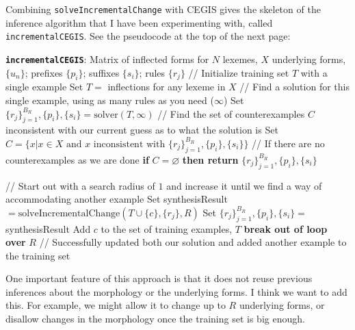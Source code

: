 \documentclass{article}
\begin{document}
Combining \texttt{solveIncrementalChange} with CEGIS gives the
skeleton of the inference algorithm that I have been experimenting
with, called \texttt{incrementalCEGIS}. See the pseudocode at the top of the next page:
\pagebreak
\begin{algorithmic}
  \STATE \textbf{\texttt{incrementalCEGIS}}:
   Matrix of inflected forms for $N$ lexemes, $X$
   underlying forms, $\{u_n\}$; prefixes $\{p_i\}$; suffixes $\{s_i\}$; rules $\{r_j\}$
  \STATE // Initialize training set $T$ with a single example
  \STATE Set $T = $ inflections for any lexeme in $X$
  \STATE // Find a solution for this single example, using as many rules as you need ($\infty$)
  \STATE Set $\{r_j\}_{j = 1}^{B_R}, \{p_i\}, \{s_i\} = \text{solver}(T,\infty)$
  \REPEAT
  \STATE // Find the set of counterexamples $C$ inconsistent with our current guess as to what the solution is
  \STATE Set $C = \{x | x\in X \text{ and } x \text{ inconsistent with } \{r_j\}_{j = 1}^{B_R},\{p_i\}, \{s_i\}\}$
  \STATE // If there are no counterexamples as we are done
  \STATE \textbf{if} $C = \varnothing$ \textbf{ then return }$\{r_j\}_{j = 1}^{B_R},\{p_i\}, \{s_i\}$

  \STATE // Start out with a search radius of $1$ and increase it until we find a way of accommodating another example
  \STATE Set synthesisResult$ = \text{solveIncrementalChange}(T\cup\{c\},\{r_j\},R)$
  \STATE Set $\{r_j\}_{j = 1}^{B_R}, \{p_i\}, \{s_i\} = $synthesisResult
  \STATE Add $c$ to the set of training examples, $T$
  \STATE \textbf{break out of loop over }$R$ // Successfully updated both our solution and added another example to the training set
\end{algorithmic}
\vspace{1cm} 

One important feature of this approach is that it does not reuse
previous inferences about the morphology or the underlying forms.
I think we want to add this.
For example, we might allow it to change up to $R$ underlying forms,
or disallow changes in the morphology once the training set is big enough.
\end{document}
